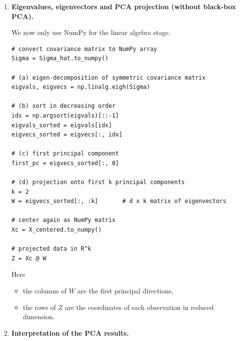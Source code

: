 \documentclass[11pt]{article}
\begin{document}
\begin{enumerate}
\begin{verbatim}
# (e) check using pandas built-in covariance function
Sigma_pandas = df.cov()

print("pandas DataFrame .cov():")
print(Sigma_pandas)
\end{verbatim}

Comments:
\begin{itemize}
  \item \verb|df.mean(axis=0)| computes column-wise means (one per variable $X_j$).
  \item Centering \verb|df - mu_hat| is done column by column automatically.
  \item \verb|df.cov()| directly implements the empirical covariance with the divisor $n-1$.
\end{itemize}

\bigskip

\item \textbf{Eigenvalues, eigenvectors and PCA projection (without black-box PCA).}

We now only use NumPy for the linear algebra stage.

\begin{verbatim}
# convert covariance matrix to NumPy array
Sigma = Sigma_hat.to_numpy()

# (a) eigen-decomposition of symmetric covariance matrix
eigvals, eigvecs = np.linalg.eigh(Sigma)

# (b) sort in decreasing order
idx = np.argsort(eigvals)[::-1]
eigvals_sorted = eigvals[idx]
eigvecs_sorted = eigvecs[:, idx]

# (c) first principal component
first_pc = eigvecs_sorted[:, 0]

# (d) projection onto first k principal components
k = 2
W = eigvecs_sorted[:, :k]       # d x k matrix of eigenvectors

# center again as NumPy matrix
Xc = X_centered.to_numpy()

# projected data in R^k
Z = Xc @ W
\end{verbatim}

Here
\begin{itemize}
  \item the columns of \(W\) are the first principal directions,
  \item the rows of \(Z\) are the coordinates of each observation in reduced dimension.
\end{itemize}

\bigskip

\item \textbf{Interpretation of the PCA results.}


\end{enumerate}
\end{document}
